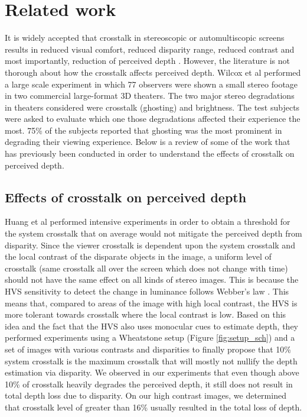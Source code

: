 \chapter{Related work}
\label{chap:relatedWork}
It is widely accepted that crosstalk in stereoscopic or automultiscopic screens results in reduced visual comfort, reduced disparity range, reduced contrast and most importantly, reduction of perceived depth \cite{woods2012crosstalk}\cite{wilcox2003determinants} \cite{tsirlin2012crosstalk}. However, the literature is not thorough about how the crosstalk affects perceived depth. Wilcox et al \cite{wilcox2003determinants} performed a large scale experiment in which 77 observers were shown a small stereo footage in two commercial large-format 3D theaters. The two major stereo degradations in theaters considered were crosstalk (ghosting) and brightness. The test subjects were asked to evaluate which one those degradations affected their experience the most. 75\% of the subjects reported that ghosting was the most prominent in degrading their viewing experience. Below is a review of some of the work that has previously been conducted in order to understand the effects of crosstalk on perceived depth.

\section{Effects of crosstalk on perceived depth}
Huang et al \cite{huang2003crosstalk} performed intensive experiments in order to obtain a threshold for the system crosstalk that on average would not mitigate the perceived depth from disparity. Since the viewer crosstalk is dependent upon the system crosstalk and the local contrast of the disparate objects in the image, a uniform level of crosstalk (same crosstalk all over the screen which does not change with time) should not have the same effect on all kinds of stereo images. This is because the HVS sensitivity to detect the change in luminance follows Webber's law \cite{webber}. This means that, compared to areas of the image with high local contrast, the HVS is more tolerant towards crosstalk where the local contrast is low. Based on this idea and the fact that the HVS also uses monocular cues to estimate depth, they performed experiments using a Wheatstone setup (Figure \ref{fig:setup_sch}) and a set of images with various contrasts and disparities to finally propose that 10\% system crosstalk is the maximum crosstalk that will mostly not nullify the depth estimation via disparity. We observed in our experiments that even though above 10\% of crosstalk heavily degrades the perceived depth, it still does not result in total depth loss due to disparity. On our high contrast images, we determined that crosstalk level of greater than 16\% usually resulted in the total loss of depth.

